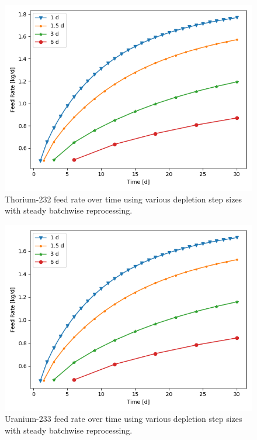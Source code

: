 {\begin{figure}[H]
  \centering
  \includegraphics[scale=0.7]{images/feed_Th232_6d_sp_comp.png}
  \caption{Thorium-232 feed rate over time using various depletion step sizes with steady batchwise reprocessing.}
   \label{fig:steady-batch-th-repr}
\end{figure}

\begin{figure}[H]
  \centering
  \includegraphics[scale=0.7]{images/feed_U233_6d_sp_comp.png}
  \caption{Uranium-233 feed rate over time using various depletion step sizes with steady batchwise reprocessing.}
   \label{fig:steady-batch-u-repr}
\end{figure}

}
